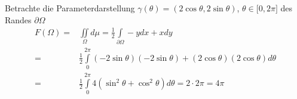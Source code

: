 \begin{enumerate}
Betrachte die Parameterdarstellung $\gamma\left(\theta\right)=\left( 2\cos\theta,2\sin\theta\right)$, $\theta\in\lbrack 0,2\pi\rbrack$ des Randes $\partial\Omega$
\begin{align*}
F\left(\Omega\right)=&\iint\limits_\Omega d\mu = \frac{1}{2}\int\limits_{\partial\Omega} -ydx+xdy\\
=&\frac{1}{2}\int\limits_0^{2\pi}\left( -2\sin\theta\right)\left( -2\sin\theta\right) + \left( 2\cos\theta\right)\left( 2\cos\theta\right) d\theta\\
=&\frac{1}{2}\int\limits_0^{2\pi}4\left( \sin^2\theta+\cos^2\theta\right)d\theta=2\cdot 2\pi=4\pi
\end{align*}
\end{enumerate}
